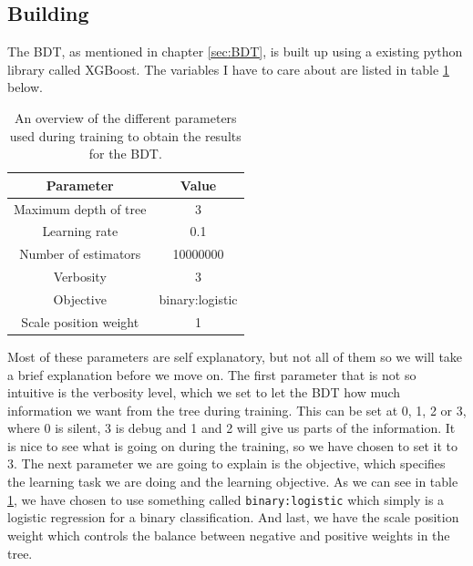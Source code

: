 \subsection{Building}
The BDT, as mentioned in chapter \ref{sec:BDT}, is built up using a existing python library called XGBoost. The variables I have to care about are listed in table \ref{tab:parametersBDT} below. 



\begin{table}[H]
    \centering
    \renewcommand{\arraystretch}{1.}
    \begin{tabular}{c c}
    \toprule
    \textbf{Parameter} & \textbf{Value}\\
    \midrule
    \midrule
    Maximum depth of tree & 3\\
    Learning rate     & 0.1 \\
    Number of estimators     & 10000000\\
    Verbosity & 3\\
    Objective & binary:logistic\\
    Scale position weight & 1\\
    \bottomrule
    \end{tabular}
    \caption{An overview of the different parameters used during training to obtain the results for the BDT.}
    \label{tab:parametersBDT}
\end{table}

Most of these parameters are self explanatory, but not all of them so we will take a brief explanation before we move on. The first parameter that is not so intuitive is the verbosity level, which we set to let the BDT how much information we want from the tree during training. This can be set at 0, 1, 2 or 3, where 0 is silent, 3 is debug and 1 and 2 will give us parts of the information. It is nice to see what is going on during the training, so we have chosen to set it to 3. The next parameter we are going to explain is the objective, which specifies the learning task we are doing and the learning objective. As we can see in table \ref{tab:parametersBDT}, we have chosen to use something called \texttt{binary:logistic} which simply is a logistic regression for a binary classification. And last, we have the scale position weight which controls the balance between negative and positive weights in the tree. 

